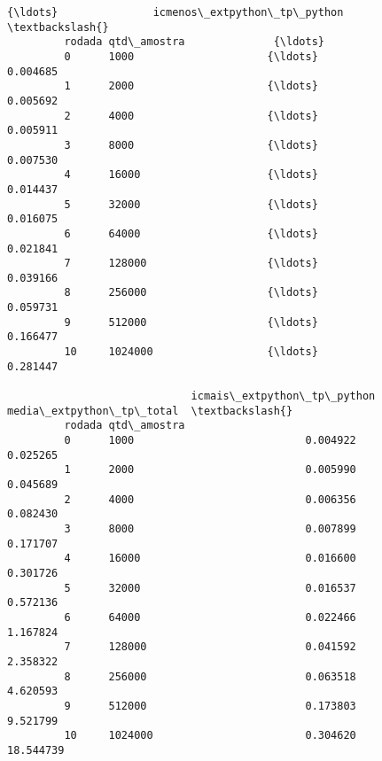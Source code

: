 \documentclass[11pt]{article}
\begin{document}
\begin{Verbatim}[commandchars=\\\{\}]
                                         {\ldots}               icmenos\_extpython\_tp\_python  \textbackslash{}
         rodada qtd\_amostra              {\ldots}                                             
         0      1000                     {\ldots}                                  0.004685   
         1      2000                     {\ldots}                                  0.005692   
         2      4000                     {\ldots}                                  0.005911   
         3      8000                     {\ldots}                                  0.007530   
         4      16000                    {\ldots}                                  0.014437   
         5      32000                    {\ldots}                                  0.016075   
         6      64000                    {\ldots}                                  0.021841   
         7      128000                   {\ldots}                                  0.039166   
         8      256000                   {\ldots}                                  0.059731   
         9      512000                   {\ldots}                                  0.166477   
         10     1024000                  {\ldots}                                  0.281447   
         
                             icmais\_extpython\_tp\_python  media\_extpython\_tp\_total  \textbackslash{}
         rodada qtd\_amostra                                                         
         0      1000                           0.004922                  0.025265   
         1      2000                           0.005990                  0.045689   
         2      4000                           0.006356                  0.082430   
         3      8000                           0.007899                  0.171707   
         4      16000                          0.016600                  0.301726   
         5      32000                          0.016537                  0.572136   
         6      64000                          0.022466                  1.167824   
         7      128000                         0.041592                  2.358322   
         8      256000                         0.063518                  4.620593   
         9      512000                         0.173803                  9.521799   
         10     1024000                        0.304620                 18.544739   
         

\end{Verbatim}
\end{document}
